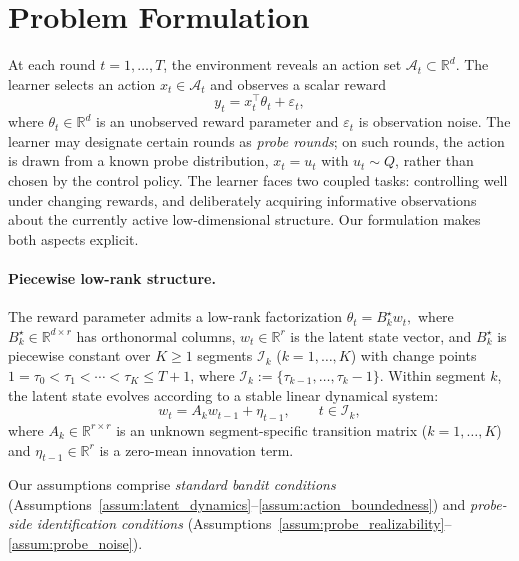 \documentclass{article}
\newcommand{\R}{\mathbb{R}}
\newcommand{\cA}{\mathcal{A}}
\newcommand{\cI}{\mathcal{I}}
\begin{document}



\section{Problem Formulation}
\label{sec:formulation}

At each round $t = 1, \ldots, T$, the environment reveals an action set $\cA_t \subset \R^d$.
The learner selects an action $x_t \in \cA_t$ and observes a scalar reward
\begin{equation}
  y_t = x_t^\top \theta_t + \varepsilon_t,
  \label{eq:reward}
\end{equation}
where $\theta_t \in \R^d$ is an unobserved reward parameter and $\varepsilon_t$ is observation noise.
The learner may designate certain rounds as \emph{probe rounds}; on such rounds, the action is drawn from a known probe distribution, $x_t = u_t$ with $u_t \sim Q$, rather than chosen by the control policy. The learner faces two coupled tasks: controlling well under changing rewards, and deliberately acquiring informative observations about the currently active low-dimensional structure.
Our formulation makes both aspects explicit.

\paragraph{Piecewise low-rank structure.} The reward parameter admits a low-rank factorization $\theta_t = B_k^\star w_t,$ where $B_k^\star \in \R^{d \times r}$ has orthonormal columns, $w_t \in \R^r$ is the latent state vector, and $B_k^\star$ is piecewise constant over $K \ge 1$ segments $\cI_k$ ($k = 1, \ldots, K$) with change points $1 = \tau_0 < \tau_1 < \cdots < \tau_K \le T+1$, where $\cI_k := \{\tau_{k-1}, \ldots, \tau_k - 1\}$.
Within segment $k$, the latent state evolves according to a stable linear dynamical system:
\begin{equation}
  w_t = A_k w_{t-1} + \eta_{t-1}, \qquad t \in \cI_k,
  \label{eq:lds}
\end{equation}
where $A_k \in \R^{r \times r}$ is an unknown segment-specific transition matrix ($k = 1, \ldots, K$) and $\eta_{t-1} \in \R^r$ is a zero-mean innovation term.

Our assumptions comprise \emph{standard bandit conditions} (Assumptions~\ref{assum:latent_dynamics}--\ref{assum:action_boundedness}) and \emph{probe-side identification conditions} (Assumptions~\ref{assum:probe_realizability}--\ref{assum:probe_noise}).
\end{document}
